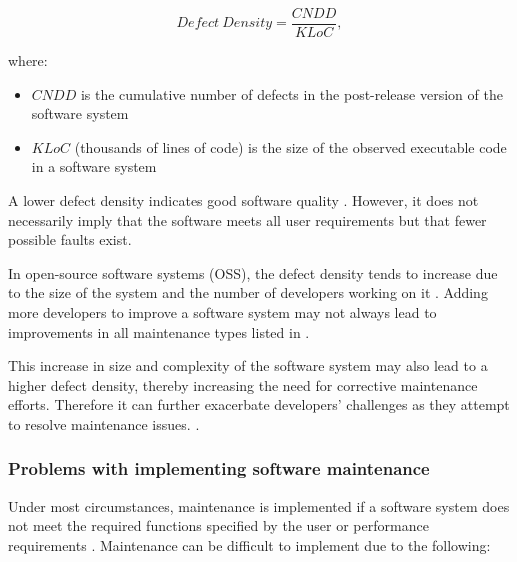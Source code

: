 \begin{equation}
	\label{eq:ch1_defectDensity}
	Defect~Density = \frac{CNDD}{KLoC},
\end{equation}

where:

\begin{itemize}
	\item $CNDD$ is the cumulative number of defects in the post-release version of the software system
	\item $KLoC$ (thousands of lines of code) is the size of the observed executable code in a software system 
\end{itemize}

A lower defect density indicates good software quality \cite{Shah2012, Alenezi2016}. However, it does not necessarily imply that the software meets all user requirements but that fewer possible faults exist.\par In open-source software systems (OSS), the defect density tends to increase due to the size of the system and the number of developers working on it \cite{Rahmani2010}. Adding more developers to improve a software system may not always lead to improvements in all maintenance types listed in .\par This increase in size and complexity of the software system may also lead to a higher defect density, thereby increasing the need for corrective maintenance efforts. Therefore it can further exacerbate developers' challenges as they attempt to resolve maintenance issues. \cite{SourceForged2009}.

\subsubsection{Problems with implementing software maintenance}\label{sec:ch1_maintenanceProblems}
Under most circumstances, maintenance is implemented if a software system does not meet the required functions specified by the user or performance requirements \cite{Ogheneovo2014, Sneed2004}. Maintenance can be difficult to implement due to the following:

